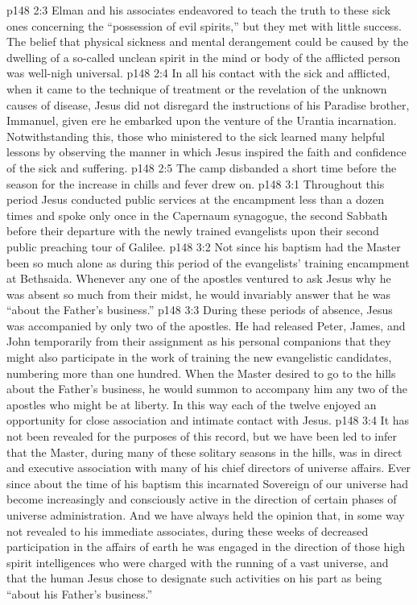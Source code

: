 \vs p148 2:3 Elman and his associates endeavored to teach the truth to these sick ones concerning the “possession of evil spirits,” but they met with little success. The belief that physical sickness and mental derangement could be caused by the dwelling of a so\hyp{}called unclean spirit in the mind or body of the afflicted person was well\hyp{}nigh universal.
\vs p148 2:4 In all his contact with the sick and afflicted, when it came to the technique of treatment or the revelation of the unknown causes of disease, Jesus did not disregard the instructions of his Paradise brother, Immanuel, given ere he embarked upon the venture of the Urantia incarnation. Notwithstanding this, those who ministered to the sick learned many helpful lessons by observing the manner in which Jesus inspired the faith and confidence of the sick and suffering.
\vs p148 2:5 The camp disbanded a short time before the season for the increase in chills and fever drew on.
\vs p148 3:1 Throughout this period Jesus conducted public services at the encampment less than a dozen times and spoke only once in the Capernaum synagogue, the second Sabbath before their departure with the newly trained evangelists upon their second public preaching tour of Galilee.
\vs p148 3:2 Not since his baptism had the Master been so much alone as during this period of the evangelists’ training encampment at Bethsaida. Whenever any one of the apostles ventured to ask Jesus why he was absent so much from their midst, he would invariably answer that he was \textcolor{ubdarkred}{“about the Father’s business.”}
\vs p148 3:3 During these periods of absence, Jesus was accompanied by only two of the apostles. He had released Peter, James, and John temporarily from their assignment as his personal companions that they might also participate in the work of training the new evangelistic candidates, numbering more than one hundred. When the Master desired to go to the hills about the Father’s business, he would summon to accompany him any two of the apostles who might be at liberty. In this way each of the twelve enjoyed an opportunity for close association and intimate contact with Jesus.
\vs p148 3:4 It has not been revealed for the purposes of this record, but we have been led to infer that the Master, during many of these solitary seasons in the hills, was in direct and executive association with many of his chief directors of universe affairs. Ever since about the time of his baptism this incarnated Sovereign of our universe had become increasingly and consciously active in the direction of certain phases of universe administration. And we have always held the opinion that, in some way not revealed to his immediate associates, during these weeks of decreased participation in the affairs of earth he was engaged in the direction of those high spirit intelligences who were charged with the running of a vast universe, and that the human Jesus chose to designate such activities on his part as being \textcolor{ubdarkred}{“about his Father’s business.”}
